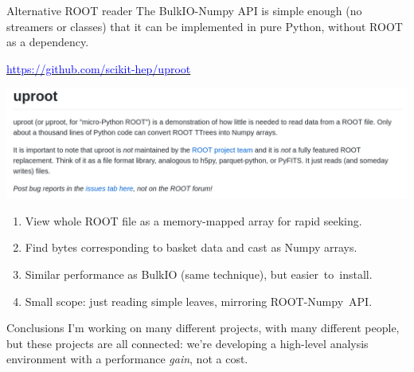 \documentclass{beamer}
\begin{document}
\begin{frame}{Alternative ROOT reader}
\vspace{0.5 cm}
The BulkIO-Numpy API is simple enough (no streamers or classes) that it can be implemented in pure Python, without ROOT as a dependency.

\begin{center}
\href{https://github.com/scikit-hep/uproot}{\textcolor{blue}{https://github.com/scikit-hep/uproot}}

\includegraphics[width=0.9\linewidth]{uproot.png}
\end{center}

\begin{minipage}{\linewidth}
\small
\begin{enumerate}
\item View whole ROOT file as a memory-mapped array for rapid seeking.
\item Find bytes corresponding to basket data and cast as Numpy arrays.
\item Similar performance as BulkIO (same technique), but \mbox{easier to install.\hspace{-1 cm}}
\item Small scope: just reading simple leaves, mirroring \mbox{ROOT-Numpy API.\hspace{-1 cm}}
\end{enumerate}
\end{minipage}
\end{frame}

\begin{frame}{Conclusions}
\vspace{0.5 cm}
I'm working on many different projects, with many different people, but these projects are all connected: we're developing a high-level analysis environment with a performance {\it gain}, not a cost.

\vspace{0.5 cm}

\vspace{0.5 cm}
\end{frame}
\end{document}
